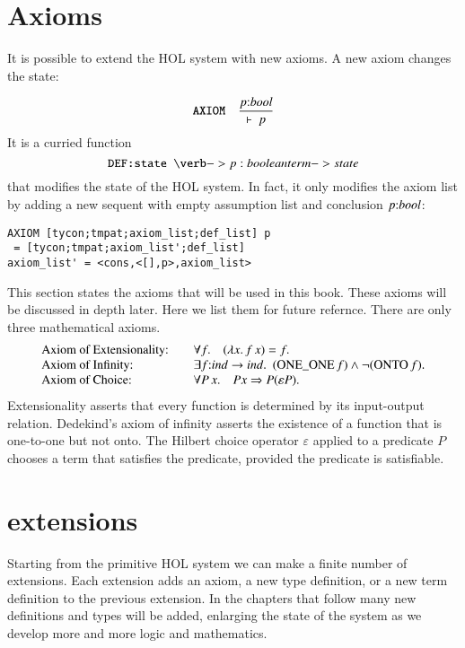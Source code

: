 \section{Axioms}

It is possible to extend the HOL system with new axioms.  A new axiom changes the state:

$$
\verb!AXIOM!\quad \frac{p\tc bool}
{\vdash~p}
$$
It is a curried function
$$
\verb!DEF:state \verb! -> {p : boolean term} -> state
$$
that modifies the state of the HOL system.  In fact, it only modifies the axiom list by adding a new sequent with empty assumption list and conclusion $p\hbox{:} bool$:
\begin{verbatim}
AXIOM [tycon;tmpat;axiom_list;def_list] p 
 = [tycon;tmpat;axiom_list';def_list]
axiom_list' = <cons,<[],p>,axiom_list>
\end{verbatim}



This section states the axioms that will be used in this book. These axioms will be discussed in depth later.  Here we list them for future refernce.  There are only three mathematical axioms.
$$\begin{array}{lll}
\hbox{Axiom of Extensionality:} &\quad\forall f.\hskip1em(\lambda x.\, f\, x) = f.\\
\hbox{Axiom of Infinity:} &\quad\exists f\hbox{:} ind\to ind.~~({\operatorname{ONE\_ONE}}\,f) \land \neg({\operatorname{ONTO}}\, f).\\
\hbox{Axiom of Choice:}&\quad  
\forall P\,x.\hskip1em P x \Rightarrow  P(\varepsilon P).\\
\end{array}
$$
Extensionality asserts that every function is determined by its input-output relation. Dedekind's axiom of infinity asserts the existence of a function that is one-to-one but not onto.  The Hilbert choice operator $\varepsilon$ applied to a predicate $P$ chooses a term that satisfies the predicate, provided the
predicate is satisfiable.


\section{extensions}

Starting from the primitive HOL system we can make a finite number of extensions.  Each extension adds an axiom, a new type definition, or a new term definition to the previous extension.  In the chapters that follow many new definitions and types will be added, enlarging the state of the system as we develop more and more logic and mathematics.


